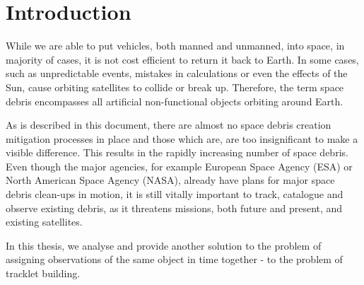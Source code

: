 \chapter{Introduction}\label{chap:intro}
	
	While we are able to put vehicles, both manned and unmanned, into space, in majority of cases, it is not cost efficient to return it back to Earth. In some cases, such as unpredictable events, mistakes in calculations or even the effects of the Sun, cause orbiting satellites to collide or break up. Therefore, the term space debris encompasses all artificial non-functional objects orbiting around Earth.

	As is described in this document, there are almost no space debris creation mitigation processes in place and those which are, are too insignificant to make a visible difference. This results in the rapidly increasing number of space debris. Even though the major agencies, for example European Space Agency (ESA) or North American Space Agency (NASA), already have plans for major space debris clean-ups in motion, it is still vitally important to track, catalogue and observe existing debris, as it threatens missions, both future and present, and existing satellites.

	In this thesis, we analyse and provide another solution to the problem of assigning observations of the same object in time together - to the problem of tracklet building.